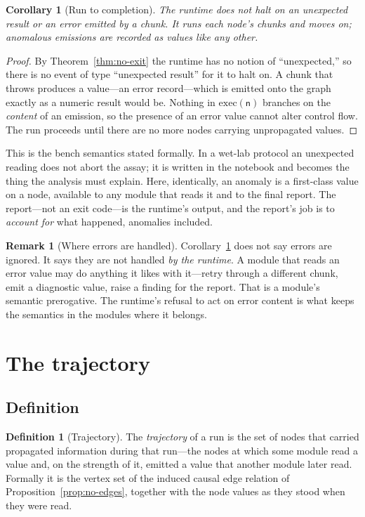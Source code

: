 \documentclass[11pt,a4paper,twocolumn]{article}
\newtheorem{corollary}[theorem]{Corollary}
\theoremstyle{definition}
\newtheorem{definition}[theorem]{Definition}
\newtheorem{remark}[theorem]{Remark}
\newcommand{\node}{\mathsf{n}}
\newcommand{\dispatch}{\mathrm{exec}}
\begin{document}
\begin{corollary}[Run to completion]
\label{cor:completion}
The runtime does not halt on an unexpected result or an error emitted by a
chunk. It runs each node's chunks and moves on; anomalous emissions are recorded
as values like any other.
\end{corollary}

\begin{proof}
By Theorem~\ref{thm:no-exit} the runtime has no notion of ``unexpected,'' so
there is no event of type ``unexpected result'' for it to halt on. A chunk that
throws produces a value---an error record---which is emitted onto the graph
exactly as a numeric result would be. Nothing in $\dispatch(\node)$ branches on
the \emph{content} of an emission, so the presence of an error value cannot
alter control flow. The run proceeds until there are no more nodes carrying
unpropagated values.
\end{proof}

This is the bench semantics stated formally. In a wet-lab protocol an
unexpected reading does not abort the assay; it is written in the notebook and
becomes the thing the analysis must explain. Here, identically, an anomaly is a
first-class value on a node, available to any module that reads it and to the
final report. The report---not an exit code---is the runtime's output, and the
report's job is to \emph{account for} what happened, anomalies included.

\begin{remark}[Where errors are handled]
Corollary~\ref{cor:completion} does not say errors are ignored. It says they are
not handled \emph{by the runtime}. A module that reads an error value may do
anything it likes with it---retry through a different chunk, emit a diagnostic
value, raise a finding for the report. That is a module's semantic prerogative.
The runtime's refusal to act on error content is what keeps the semantics in the
modules where it belongs.
\end{remark}

\section{The trajectory}
\label{sec:trajectory}

\subsection{Definition}

\begin{definition}[Trajectory]
\label{def:trajectory}
The \emph{trajectory} of a run is the set of nodes that carried propagated
information during that run---the nodes at which some module read a value and,
on the strength of it, emitted a value that another module later read. Formally
it is the vertex set of the induced causal edge relation of
Proposition~\ref{prop:no-edges}, together with the node values as they stood
when they were read.
\end{definition}
\end{document}

